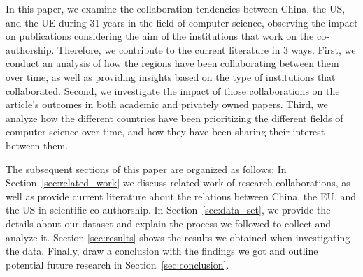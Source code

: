In this paper, we examine the collaboration tendencies between China, the US, and the UE during 31 years in the field of computer science, observing the impact on publications considering the aim of the institutions that work on the co-authorship. Therefore, we contribute to the current literature in 3 ways.  First, we conduct an analysis of how the regions have been collaborating between them over time, as well as providing insights based on the type of institutions that collaborated. Second, we investigate the impact of those collaborations on the article’s outcomes in both academic and privately owned papers. Third, we analyze how the different countries have been prioritizing the different fields of computer science over time, and how they have been sharing their interest between them.

The subsequent sections of this paper are organized as follows: In Section~\ref{sec:related_work} we discuss related work of research collaborations, as well as provide current literature about the relations between China, the EU, and the US in scientific co-authorship. In Section~\ref{sec:data_set}, we provide the details about our dataset and explain the process we followed to collect and analyze it. Section \ref{sec:results} shows the results we obtained when investigating the data. Finally, draw a conclusion with the findings we got and outline potential future research in Section~\ref{sec:conclusion}.